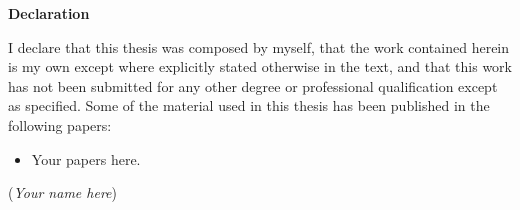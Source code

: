 \vspace*{1.75in}

\begin{center} {\bf \sffamily Declaration}\end{center}

I declare that this thesis was composed by myself, that the work contained herein is
my own except where explicitly stated otherwise in the text, and that this work has not
been submitted for any other degree or professional qualification except as specified.
Some of the material used in this thesis has been published in the following papers:

\begin{itemize}
    \item Your papers here.
\end{itemize}

\hspace*{\fill}(\textit{Your name here})
